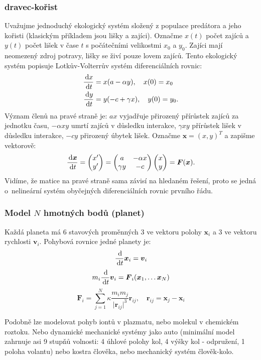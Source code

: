 \documentclass[a4paper, 12pt]{book}
\theoremstyle{definition}
\def\d{\,{\rm d}}               %
\def\vc#1{\mathbf{\boldsymbol{#1}}}     %
\def\abs#1{\lvert#1\rvert}
\begin{document}
\subsubsection{dravec-kořist}
Uvažujme jednoduchý ekologický systém složený z populace predátora  a jeho kořisti (klasickým příkladem jsou lišky a zajíci).
Označme $x(t)$ počet zajíců a $y(t)$ počet lišek v čase $t$ s počátečními velikostmi $x_0$ a $y_0$. 
Zajíci mají neomezený zdroj potravy, lišky se živí pouze lovem zajíců.
Tento ekologický systém popisuje Lotkův-Volterrův systém diferenciálních rovnic:
\begin{align}
  \frac{\d x}{\d t} &= x(a-\alpha y), \quad x(0)=x_0\\
  \frac{\d y}{\d t} &= y(-c+\gamma x), \quad y(0)=y_0.
\end{align}
Význam členů na pravé straně je: $ax$ vyjadřuje přirozený přírůstek zajíců za jednotku času, $-\alpha xy$ umrtí zajíců v důsledku interakce,
$\gamma x y$ přírůstek lišek v důsledku interakce, $-cy$ přirozený úbytek lišek.
Označme $\vc x = (x,y)^T$ a zapišme vektorově:
\[
   \frac{\d \vc x}{\d t} = \begin{pmatrix} x'\\ y' \end{pmatrix}
   = \begin{pmatrix} a & -\alpha x \\ \gamma y & - c\end{pmatrix} 
     \begin{pmatrix} x \\ y\end{pmatrix} = \vc F(\vc x).
\]
Vidíme, že matice na pravé straně sama závisí na hledaném řešení, proto se jedná o~nelineární systém obyčejných diferenciálních rovnic prvního řádu.

\subsubsection{Model $N$ hmotných bodů (planet)}
Každá planeta má 6 stavových proměnných 3 ve vektoru polohy $\vc x_i$ a 3 ve vektoru rychlosti $\vc v_i$. Pohybová rovnice jedné planety je:
\[
    \frac{\d}{\d t} \vc x_i = \vc v_i 
\]
\[
    m_i \frac{\d}{\d t} \vc v_i = \vc F_i(\vc x_1, \dots \vc x_N) 
\]
\[
    \vc F_i = \sum_{j=1}^{N} \kappa \frac{m_i m_j}{\abs{\vc r_{ij}}^3}\vc r_{ij},\quad  \vc r_{ij}=\vc x_j - \vc x_i
\]

Podobně lze modelovat pohyb iontů v plazmatu, nebo molekul v chemickém roztoku. Nebo dynamické mechanické systémy jako auto (minimální model zahrnuje
asi 9 stupňů volnosti: 4 úhlové polohy kol, 4 výšky kol - odpružení,  1 poloha volantu) nebo kostra člověka, nebo mechanický systém člověk-kolo.
\end{document}
